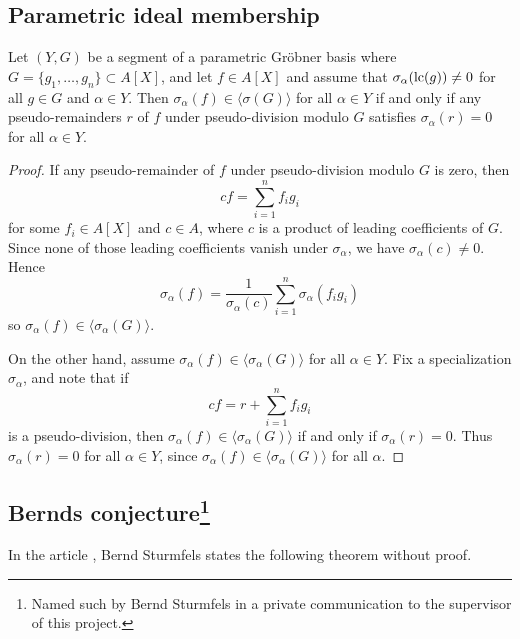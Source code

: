 \subsection{Parametric ideal membership}


\begin{theorem}
  Let $(Y, G)$ be a segment of a parametric Gröbner basis where $G = \{g_{1}, \dots, g_{n}\} \subset A[X]$, and let $f \in A[X]$ and assume that $\sigma_{\alpha}(\operatorname{lc}(g)) \neq 0$ for all $g \in G$ and $\alpha \in Y$. Then $\sigma_{\alpha}(f) \in \langle \sigma(G) \rangle$ for all $\alpha \in Y$ if and only if any pseudo-remainders $r$ of $f$ under pseudo-division modulo $G$ satisfies $\sigma_{\alpha}(r) = 0$ for all $\alpha \in Y$.
\end{theorem}
\begin{proof}
  If any pseudo-remainder of $f$ under pseudo-division modulo $G$ is zero, then
  \[cf = \sum_{i=1}^{n} f_{i} g_{i}\]
  for some $f_{i} \in A[X]$ and $c \in A$, where $c$ is a product of leading coefficients of $G$. Since none of those leading coefficients vanish under $\sigma_{\alpha}$, we have $\sigma_{\alpha}(c) \neq 0$. Hence
  \[\sigma_{\alpha}(f) = \frac 1 {\sigma_{\alpha}(c)}\sum_{i=1}^{n} \sigma_{\alpha}(f_{i} g_{i})\]
  so $\sigma_{\alpha}(f) \in \langle \sigma_{\alpha}(G) \rangle$.

  On the other hand, assume $\sigma_{\alpha}(f) \in \langle \sigma_{\alpha}(G) \rangle$ for all $\alpha \in Y$. Fix a specialization $\sigma_{\alpha}$, and note that if
  \[cf = r + \sum_{i=1}^{n} f_{i} g_{i}\]
  is a pseudo-division, then $\sigma_{\alpha}(f) \in \langle \sigma_{\alpha}(G) \rangle$ if and only if $\sigma_{\alpha}(r) = 0$. Thus $\sigma_{\alpha}(r) = 0$ for all $\alpha \in Y$, since $\sigma_{\alpha}(f) \in \langle \sigma_{\alpha}(G) \rangle$ for all $\alpha$.
\end{proof}











\subsection[Bernds conjecture]{Bernds conjecture\footnote{Named such by Bernd Sturmfels in a private communication to the supervisor of this project.}}
In the article \cite{sturmfels}, Bernd Sturmfels states the following theorem without proof.

